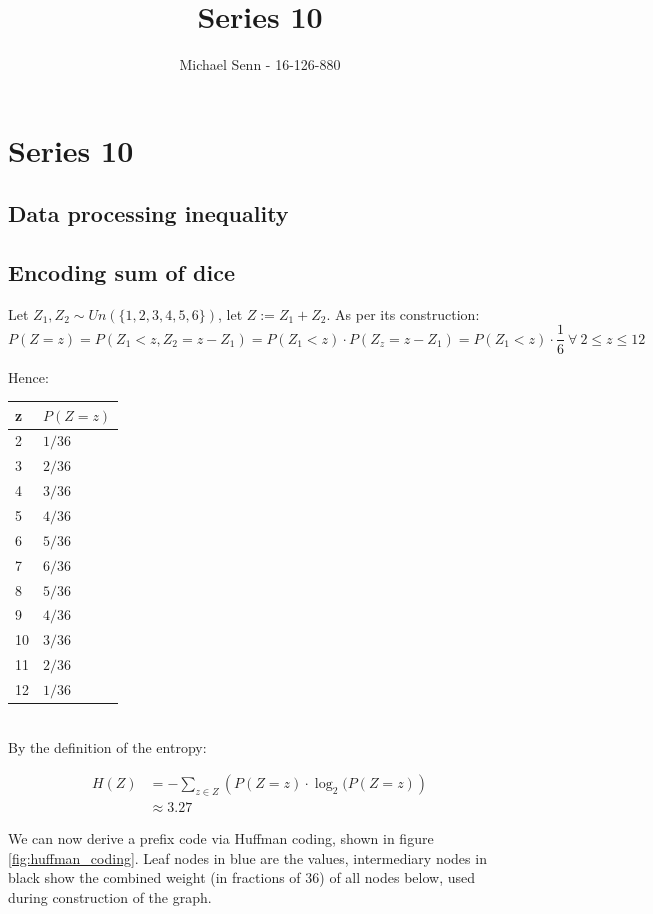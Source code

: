 \documentclass[a4paper]{scrreprt}
\title{Series 10}
\author{Michael Senn \maillink{michael.senn@students.unibe.ch} - 16-126-880}
\date{\printdate}
\begin{document}
\maketitle


\setcounter{chapter}{9}
\chapter{Series 10}

\section{Data processing inequality}

\section{Encoding sum of dice}

Let $Z_1, Z_2 \sim Un(\{1, 2, 3, 4, 5, 6\})$, let $Z := Z_1 + Z_2$. As per its
construction:
\[
	P(Z = z) = P(Z_1 < z, Z_2 = z - Z_1) = P(Z_1 < z) \cdot P(Z_z = z -Z_1) = P(Z_1 < z) \cdot \frac{1}{6}\ \forall\ 2 \leq z \leq 12
\]

Hence:
\\

\begin{tabu}{ll}
	\toprule
	z & $P(Z = z)$ \\
	  & $1 / 36$ \\
	3  & $2 / 36$ \\
	4  & $3 / 36$ \\
	5  & $4 / 36$ \\
	6  & $5 / 36$ \\
	7  & $6 / 36$ \\
	8  & $5 / 36$ \\
	9  & $4 / 36$ \\
	10 & $3 / 36$ \\
	11 & $2 / 36$ \\
	12 & $1 / 36$ \\
	\bottomrule
\end{tabu}
\\

By the definition of the entropy:

\begin{align*}
	H(Z) & = -\sum_{z \in Z}{\left(P(Z = z) \cdot \log_2(P(Z=z)\right)} \\
	& \approx 3.27
\end{align*}

We can now derive a prefix code via Huffman coding, shown in figure
\ref{fig:huffman_coding}. Leaf nodes in blue are the values, intermediary nodes
in black show the combined weight (in fractions of $36$) of all nodes below,
used during construction of the graph.
\end{document}
